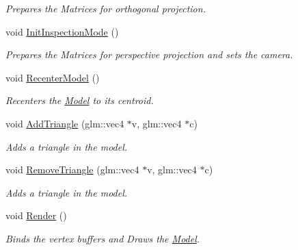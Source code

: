 \begin{DoxyCompactItemize}
\begin{DoxyCompactList}\small\item\em Prepares the Matrices for orthogonal projection. \end{DoxyCompactList}\item 
void \hyperlink{classcft_1_1Model_ace7b42bc64fdc1e7f41bb1d0b6e125c1}{Init\+Inspection\+Mode} ()\hypertarget{classcft_1_1Model_ace7b42bc64fdc1e7f41bb1d0b6e125c1}{}\label{classcft_1_1Model_ace7b42bc64fdc1e7f41bb1d0b6e125c1}

\begin{DoxyCompactList}\small\item\em Prepares the Matrices for perspective projection and sets the camera. \end{DoxyCompactList}\item 
void \hyperlink{classcft_1_1Model_a3199cede29c78675f69fc7d589667218}{Recenter\+Model} ()\hypertarget{classcft_1_1Model_a3199cede29c78675f69fc7d589667218}{}\label{classcft_1_1Model_a3199cede29c78675f69fc7d589667218}

\begin{DoxyCompactList}\small\item\em Recenters the \hyperlink{classcft_1_1Model}{Model} to its centroid. \end{DoxyCompactList}\item 
void \hyperlink{classcft_1_1Model_aab5427ba9dbd7694c8b42453b63ac157}{Add\+Triangle} (glm\+::vec4 $\ast$v, glm\+::vec4 $\ast$c)
\begin{DoxyCompactList}\small\item\em Adds a triangle in the model. \end{DoxyCompactList}\item 
void \hyperlink{classcft_1_1Model_ac706c44d6bb864ca80449e963f9dbc22}{Remove\+Triangle} (glm\+::vec4 $\ast$v, glm\+::vec4 $\ast$c)
\begin{DoxyCompactList}\small\item\em Adds a triangle in the model. \end{DoxyCompactList}\item 
void \hyperlink{classcft_1_1Model_a0e9799445aacdd8d4ace2465dbc6f350}{Render} ()\hypertarget{classcft_1_1Model_a0e9799445aacdd8d4ace2465dbc6f350}{}\label{classcft_1_1Model_a0e9799445aacdd8d4ace2465dbc6f350}

\begin{DoxyCompactList}\small\item\em Binds the vertex buffers and Draws the \hyperlink{classcft_1_1Model}{Model}. \end{DoxyCompactList}\end{DoxyCompactItemize}
